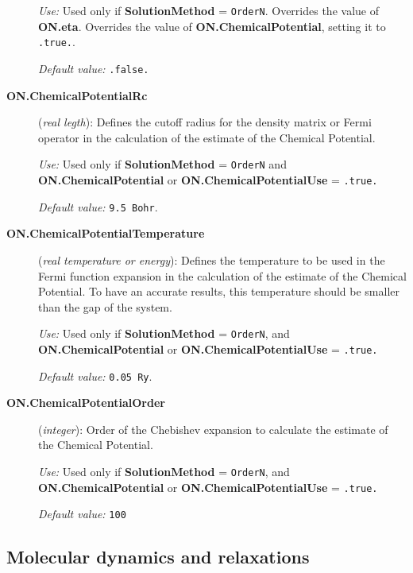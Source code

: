 \documentclass[11pt]{article}
\begin{document}
\begin{description}
{\it Use:} Used only if {\bf SolutionMethod} = {\tt OrderN}.
Overrides the value of {\bf ON.eta}.
Overrides the value of {\bf ON.ChemicalPotential}, setting
it to {\tt .true.}.

{\it Default value:} {\tt .false.}

\item[{\bf ON.ChemicalPotentialRc}]  ({\it real legth}):
Defines the cutoff radius for the density matrix or Fermi
operator in the calculation of the estimate of the
Chemical Potential.

{\it Use:} Used only if {\bf SolutionMethod} = {\tt OrderN}
and {\bf ON.ChemicalPotential} or  {\bf ON.ChemicalPotentialUse} 
= {\tt .true.}

{\it Default value:} {\tt 9.5 Bohr}.

\item[{\bf ON.ChemicalPotentialTemperature}]  ({\it real temperature 
or energy}):
Defines the temperature to be used in the Fermi function expansion
in the calculation of the estimate of the Chemical Potential.
To have an accurate results, this temperature should be smaller 
than the gap of the system.

{\it Use:} Used only if {\bf SolutionMethod} = {\tt OrderN},
and {\bf ON.ChemicalPotential} or  {\bf ON.ChemicalPotentialUse} = 
{\tt .true.}

{\it Default value:} {\tt 0.05 Ry}.

\item[{\bf ON.ChemicalPotentialOrder}] ({\it integer}):
Order of the Chebishev expansion to calculate the estimate
of the Chemical Potential. 

{\it Use:} Used only if {\bf SolutionMethod} = {\tt OrderN},
and {\bf ON.ChemicalPotential} or  {\bf ON.ChemicalPotentialUse} = 
{\tt .true.}

{\it Default value:} {\tt 100}

\end{description}



\vspace{5pt}
\subsection{Molecular dynamics and relaxations}
\end{document}
